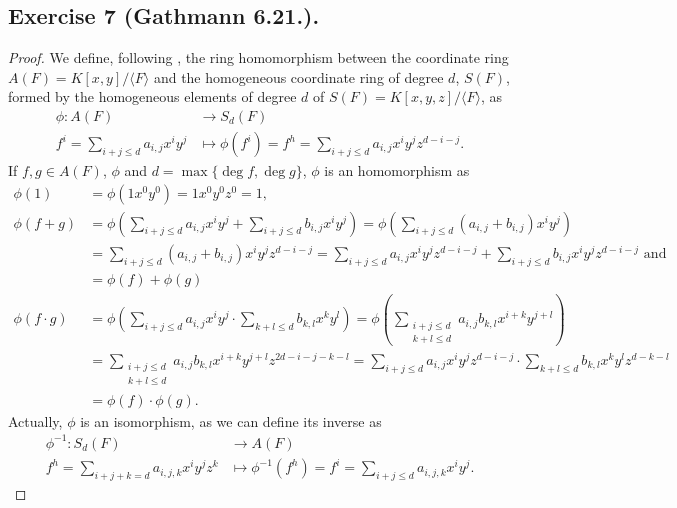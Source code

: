 \documentclass[11pt,a4paper]{article}
\begin{document}
\subsection*{Exercise 7 (Gathmann 6.21.).}
\begin{proof}
We define, following \cite[Construction 3.13]{gath}, the ring homomorphism between the coordinate ring $ A(F) = K[x, y] / \langle F \rangle $ and the homogeneous coordinate ring of degree $ d $, $ S(F)$, formed by the homogeneous elements of degree $ d $ of $ S(F) = K[x, y, z] / \langle F \rangle$, as
  \begin{align*}
    \phi: A(F) &\longrightarrow S_d(F) \\
    f^i = \sum_{i+j \leq d} a_{i,j} x^i y^j &\longmapsto \phi (f^i) = f^h = \sum_{i+j \leq d} a_{i,j} x^i y^j z^{d-i-j}.
  \end{align*}
  If $f, g \in A(F) $, $\phi $ and $ d = \operatorname{max}\{\operatorname{deg}f, \operatorname{deg}g\} $, $\phi$ is an homomorphism as
  \begin{align*}
    \phi(1) &= \phi(1 x^0 y^0) = 1 x^0 y^0 z^0 = 1, \\
    \phi(f + g) &= \phi \left(\sum_{i + j \leq d} a_{i,j} x^i y^j + \sum_{i + j \leq d} b_{i,j} x^i y^j \right) = \phi \left(\sum_{i + j \leq d} (a_{i,j} + b_{i,j})  x^i y^j \right) \\
    &= \sum_{i + j \leq d} (a_{i,j} + b_{i,j})  x^i y^j z^{d-i-j} = \sum_{i + j \leq d} a_{i,j}  x^i y^j z^{d-i-j} + \sum_{i + j \leq d} b_{i,j}  x^i y^j z^{d-i-j} \text{ and} \\
    &= \phi(f) + \phi(g)\\ 
    \phi(f \cdot g) &= \phi\left(\sum_{i + j \leq d} a_{i,j} x^i y^j \cdot \sum_{k + l \leq d} b_{k,l} x^k y^l\right) = \phi\left(\sum_{\substack{i + j \leq d\\k + l \leq d}} a_{i,j} b_{k,l} x^{i+k} y^{j+l} \right) \\
    &= \sum_{\substack{i + j \leq d\\k + l \leq d}} a_{i,j} b_{k,l} x^{i+k} y^{j+l} z^{2d-i-j-k-l} = \sum_{i + j \leq d} a_{i,j} x^{i} y^{j} z^{d-i-j} \cdot \sum_{k + l \leq d} b_{k,l} x^{k} y^{l} z^{d-k-l} \\
    &= \phi(f) \cdot \phi(g).
  \end{align*}
  Actually, $ \phi $ is an isomorphism, as we can define its inverse as
  \begin{align*}
    \phi^{-1}: S_d(F) &\longrightarrow A(F) \\
    f^h = \sum_{i+j+k = d} a_{i,j,k} x^i y^j z^k &\longmapsto \phi^{-1} (f^h) = f^i = \sum_{i+j \leq d} a_{i,j,k} x^i y^j.

\end{align*}
\end{proof}
\end{document}
